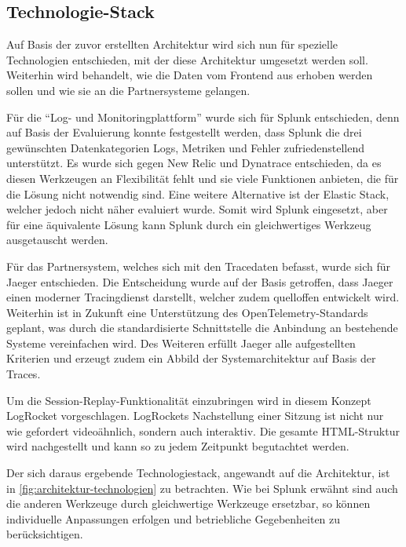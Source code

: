 	\subsection{Technologie-Stack}
	\label{sec:technologie-stack}
	
	Auf Basis der zuvor erstellten Architektur wird sich nun für spezielle Technologien entschieden, mit der diese Architektur umgesetzt werden soll. Weiterhin wird behandelt, wie die Daten vom Frontend aus erhoben werden sollen und wie sie an die Partnersysteme gelangen.
	
	Für die \enquote{Log- und Monitoringplattform} wurde sich für Splunk entschieden, denn auf Basis der Evaluierung konnte festgestellt werden, dass Splunk die drei gewünschten Datenkategorien Logs, Metriken und Fehler zufriedenstellend unterstützt. Es wurde sich gegen New Relic und Dynatrace entschieden, da es diesen Werkzeugen an Flexibilität fehlt und sie viele Funktionen anbieten, die für die Lösung nicht notwendig sind. Eine weitere Alternative ist der Elastic Stack, welcher jedoch nicht näher evaluiert wurde. Somit wird Splunk eingesetzt, aber für eine äquivalente Lösung kann Splunk durch ein gleichwertiges Werkzeug ausgetauscht werden.
	
	Für das Partnersystem, welches sich mit den Tracedaten befasst, wurde sich für Jaeger entschieden. Die Entscheidung wurde auf der Basis getroffen, dass Jaeger einen moderner Tracingdienst darstellt, welcher zudem quelloffen entwickelt wird. Weiterhin ist in Zukunft eine Unterstützung des OpenTelemetry-Standards geplant, was durch die standardisierte Schnittstelle die Anbindung an bestehende Systeme vereinfachen wird. Des Weiteren erfüllt Jaeger alle aufgestellten Kriterien und erzeugt zudem ein Abbild der Systemarchitektur auf Basis der Traces.
	
	Um die Session-Replay-Funktionalität einzubringen wird in diesem Konzept LogRocket vorgeschlagen. LogRockets Nachstellung einer Sitzung ist nicht nur wie gefordert videoähnlich, sondern auch interaktiv. Die gesamte HTML-Struktur wird nachgestellt und kann so zu jedem Zeitpunkt begutachtet werden.
	
	Der sich daraus ergebende Technologiestack, angewandt auf die Architektur, ist in \autoref{fig:architektur-technologien} zu betrachten. Wie bei Splunk erwähnt sind auch die anderen Werkzeuge durch gleichwertige Werkzeuge ersetzbar, so können individuelle Anpassungen erfolgen und betriebliche Gegebenheiten zu berücksichtigen.
	
